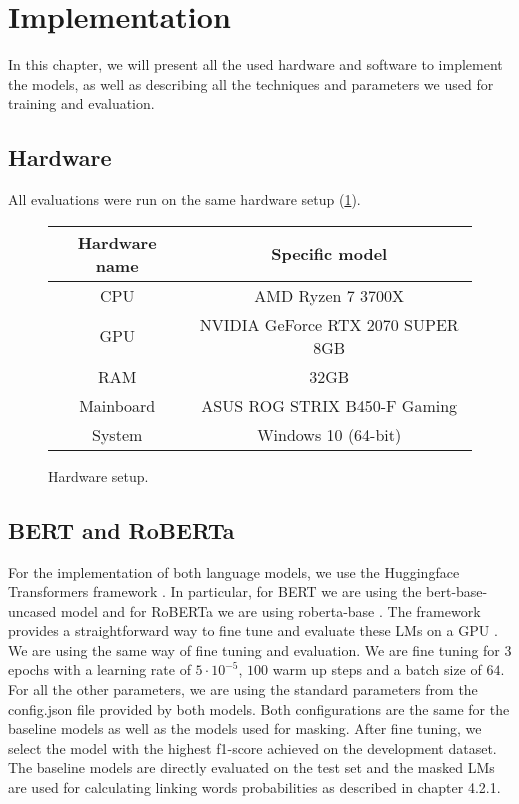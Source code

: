 \section{Implementation}
In this chapter, we will present all the used hardware and software to implement the models, as well as describing all the techniques and parameters we used for training and evaluation.

\subsection{Hardware}
All evaluations were run on the same hardware setup (\ref{fig:hardware1}).

\begin{figure}[H]
  \begin{center}
   	\begin{tabular}{|| c | c ||}
   	\hline
   	Hardware name & Specific model \\
   	\hline\hline
   	CPU & AMD Ryzen 7 3700X \\
 	\hline
 	GPU & NVIDIA GeForce RTX 2070 SUPER 8GB \\
 	\hline
 	RAM & 32GB \\
 	\hline
 	Mainboard & ASUS ROG STRIX B450-F Gaming \\
 	\hline
 	System & Windows 10 (64-bit) \\
 	\hline
	\end{tabular}
  \end{center}
  \caption{Hardware setup.}%
  \label{fig:hardware1}
\end{figure}

\subsection{BERT and RoBERTa} \label{sec:secbert}
For the implementation of both language models, we use the Huggingface Transformers framework \cite{transformers}. In particular, for BERT we are using the bert-base-uncased model \cite{bertbaseuncased} and for RoBERTa we are using roberta-base \cite{robertabase}. The framework provides a straightforward way to fine tune and evaluate these LMs on a GPU \cite{berttraining}. We are using the same way of fine tuning and evaluation. We are fine tuning for $3$ epochs with a learning rate of $5 \cdot 10^{-5}$, $100$ warm up steps and a batch size of $64$. For all the other parameters, we are using the standard parameters from the config.json file provided by both models. Both configurations are the same for the baseline models as well as the models used for masking. After fine tuning, we select the model with the highest f1-score achieved on the development dataset. \\
The baseline models are directly evaluated on the test set and the masked LMs are used for calculating linking words probabilities as described in chapter 4.2.1.

